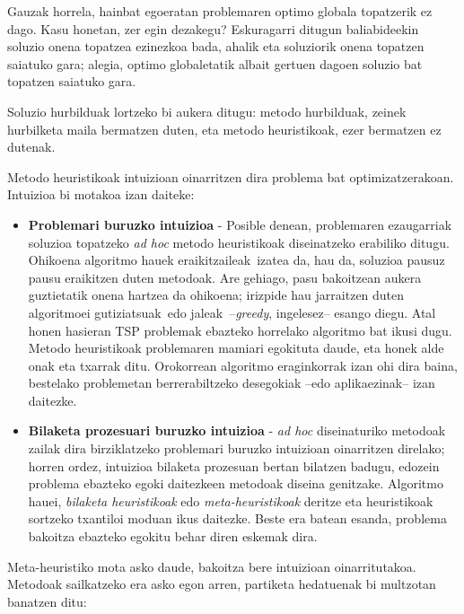 \documentclass[eu]{ifirak}\usepackage[]{graphicx}\usepackage[]{color}
\newcommand{\zkk}{\guillemotleft}
\newcommand{\skk}{\guillemotright}
\begin{document}
Gauzak horrela, hainbat egoeratan problemaren optimo globala topatzerik ez dago. Kasu honetan, zer egin dezakegu? Eskuragarri ditugun baliabideekin soluzio onena topatzea ezinezkoa bada, ahalik eta soluziorik onena topatzen saiatuko gara; alegia, optimo globaletatik albait gertuen dagoen soluzio bat topatzen saiatuko gara. 

Soluzio hurbilduak lortzeko bi aukera ditugu: metodo hurbilduak, zeinek hurbilketa maila bermatzen duten, eta metodo heuristikoak, ezer bermatzen ez dutenak. 

Metodo heuristikoak intuizioan oinarritzen dira problema bat optimizatzerakoan. Intuizioa bi motakoa izan daiteke:

\begin{itemize}
\item \textbf{Problemari buruzko intuizioa} - Posible denean, problemaren ezaugarriak soluzioa topatzeko \textit{ad hoc} metodo heuristikoak diseinatzeko erabiliko ditugu. Ohikoena algoritmo hauek \zkk eraikitzaileak\skk\ izatea da, hau da, soluzioa pausuz pausu eraikitzen duten metodoak. Are gehiago, pasu bakoitzean aukera guztietatik onena hartzea da ohikoena; irizpide hau jarraitzen duten algoritmoei \zkk gutiziatsuak\skk\ edo \zkk jaleak\skk\ --\textit{greedy}, ingelesez-- esango diegu.
Atal honen hasieran TSP problemak ebazteko horrelako algoritmo bat ikusi dugu. Metodo heuristikoak problemaren mamiari egokituta daude, eta honek alde onak eta txarrak ditu. Orokorrean algoritmo eraginkorrak izan ohi dira baina, bestelako problemetan berrerabiltzeko desegokiak --edo aplikaezinak-- izan daitezke.
\item \textbf{Bilaketa prozesuari buruzko intuizioa} - \textit{ad hoc} diseinaturiko metodoak zailak dira birziklatzeko problemari buruzko intuizioan oinarritzen direlako; horren ordez, intuizioa bilaketa prozesuan bertan bilatzen badugu, edozein problema ebazteko egoki daitezkeen metodoak diseina genitzake. Algoritmo hauei, \textit{bilaketa heuristikoak} edo \textit{meta-heuristikoak} deritze eta heuristikoak sortzeko txantiloi moduan ikus daitezke. Beste era batean esanda, problema bakoitza ebazteko egokitu behar diren eskemak dira.
\end{itemize}

Meta-heuristiko mota asko daude, bakoitza bere intuizioan oinarritutakoa. Metodoak sailkatzeko era asko egon arren, partiketa hedatuenak bi multzotan banatzen ditu:
\end{document}
